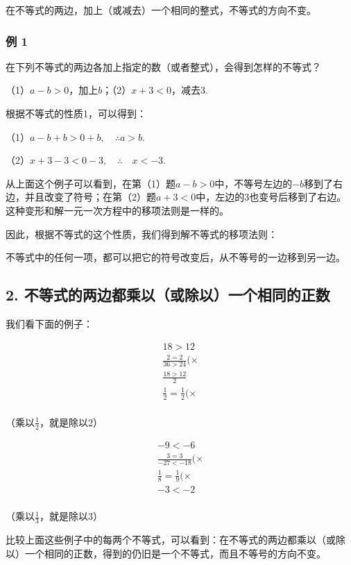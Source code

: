 在不等式的两边，加上（或减去）一个相同的整式，不等式的方向不变。

\subsubsection{例 1}

在下列不等式的两边各加上指定的数（或者整式），会得到怎样的不等式？

（1）\(a - b > 0\)，加上\(b\)；（2）\(x + 3 <   0\)，减去3.

 根据不等式的性质1，可以得到：

（1）\(a - b + b > 0 + b, \quad \therefore a > b.\)

（2）\(x + 3 - 3 <   0 - 3,\quad \therefore \quad x <   - 3.\)

从上面这个例子可以看到，在第（1）题\(a - b > 0\)中，不等号左边的\(-b\)移到了右边，并且改变了符号；在第（2）题\(a + 3 < 0\)中，左边的3也变号后移到了右边。这种变形和解一元一次方程中的移项法则是一样的。

因此，根据不等式的这个性质，我们得到解不等式的移项法则：

不等式中的任何一项，都可以把它的符号改变后，从不等号的一边移到另一边。

\subsection{2. 不等式的两边都乘以（或除以）一个相同的正数}

我们看下面的例子：

\[
\begin{array}{l} 18 > 12 \\ \frac{2 = 2}{36 > 24} (\times \\ \frac{18 > 12}{2} \\ \frac{1}{2} = \frac{1}{2} (\times \\ \end{array}
\]

（乘以\(\frac{1}{2}\)，就是除以2）

\[
\begin{array}{l} - 9 <   - 6 \\ \frac{3 = 3}{- 27 <   - 18} (\times \\ \frac{1}{8} = \frac{1}{9} (\times \\ - 3 <   - 2 \\ \end{array}
\]

（乘以\(\frac{1}{3}\)，就是除以3）

比较上面这些例子中的每两个不等式，可以看到：在不等式的两边都乘以（或除以）一个相同的正数，得到的仍旧是一个不等式，而且不等号的方向不变。

